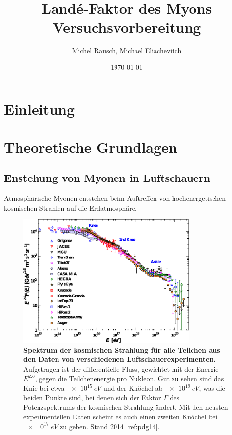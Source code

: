 \documentclass[a4paper,ngerman]{scrartcl}
\title{Landé-Faktor des Myons\\Versuchsvorbereitung}
\date{\today}
\author{Michel Rausch, Michael Eliachevitch}
\begin{document}
\maketitle
\tableofcontents
\newpage

\section{Einleitung}
\label{sec:einfuhrung}


\section{Theoretische Grundlagen}
\label{sec:theorie}

\subsection{Enstehung von Myonen in Luftschauern}
\label{sec:luftschauer}

Atmosphärische Myonen entstehen beim Auftreffen von hochenergetischen kosmischen Strahlen auf die Erdatmosphäre.


\begin{figure}[tbh!]
  \centering
  \includegraphics[width=0.8\textwidth]{abbildungen/cr_spectrum_pdg14.pdf}
  \caption{\textbf{Spektrum der kosmischen Strahlung für alle Teilchen aus den Daten von verschiedenen Luftschauerexperimenten.} Aufgetragen ist der differentielle Fluss, gewichtet mit der Energie $E^{2.6}$, gegen die Teilchenenergie pro Nukleon. Gut zu sehen sind das Knie bei etwa $\SI{e15}{eV}$ und der Knöchel ab $\SI{e19}{eV}$, was die beiden Punkte sind, bei denen sich der Faktor $\Gamma$ des Potenzspektrums der kosmischen Strahlung ändert. Mit den neusten experimentellen Daten scheint es auch einen zweiten Knöchel bei $\SI{e17}{eV}$ zu geben. Stand 2014 \ref{ref:pdg14}.}
  \label{fig:cr_spectrum}
\end{figure}
\end{document}
